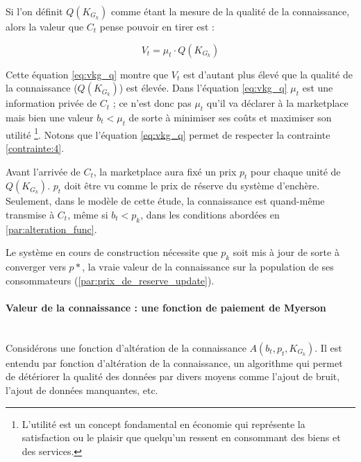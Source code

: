 Si l'on définit $Q(K_{G_k})$ comme étant la mesure de la qualité de la connaissance, alors la valeur que $C_t$ pense pouvoir en tirer est :

\begin{equation} \label{eq:vkg_q}
    V_t= \mu_t \cdot Q(K_{G_k})
\end{equation}

Cette équation \ref{eq:vkg_q} montre que $V_t$ est d'autant plus élevé que la qualité de la connaissance ($Q(K_{G_k})$) est élevée. Dans l'équation \ref{eq:vkg_q} $\mu_t$ est une information privée de $C_t$ ;  ce n'est donc pas $\mu_t$ qu'il va déclarer à la marketplace mais bien une valeur $b_t < \mu_t$ de sorte à minimiser ses coûts et maximiser son utilité \footnote{L'utilité est un concept fondamental en économie qui représente la satisfaction ou le plaisir que quelqu'un ressent en consommant des biens et des services.}. Notons que l'équation \ref{eq:vkg_q} permet de respecter la contrainte \ref{contrainte:4}.

Avant l'arrivée de $C_t$, la marketplace aura fixé un prix $p_t$ pour chaque unité de $Q(K_{G_k})$. $p_t$  doit être vu comme le prix de réserve du système d'enchère. Seulement, dans le modèle de cette étude, la connaissance est quand-même transmise à $C_t$, même si $b_t < p_k$, dans les conditions abordées en \ref{par:alteration_func}. 

Le système en cours de construction nécessite que $p_k$ soit mis à jour de sorte à converger vers $p*$, la vraie valeur de la connaissance sur la population de ses consommateurs (\ref{par:prix_de_reserve_update}).

\paragraph{Valeur de la connaissance : une fonction de paiement de Myerson\\} \label{par:valeur_kg_myerson} \\

Considérons une fonction d'altération  de la connaissance  $A(b_t,p_t,K_{G_k})$. Il est entendu par fonction d'altération de la connaissance, un algorithme qui permet de détériorer la qualité des données par divers moyens comme l'ajout de bruit, l'ajout de données manquantes, etc.

